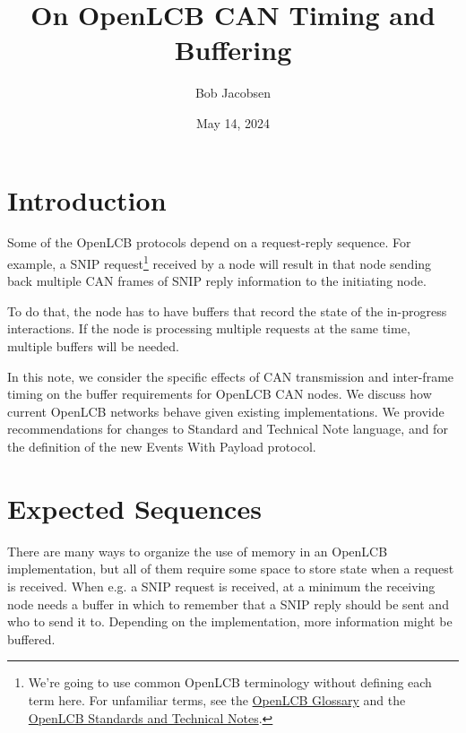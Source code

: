 \documentclass[11pt]{article}
\title{On OpenLCB CAN Timing and Buffering}
\author{Bob Jacobsen}
\date{May 14, 2024}                                         %
\begin{document}
\maketitle

\newcommand*{\xml}[1]{\texttt{<#1>}}

\newcommand{\ts}{\textsuperscript}

\newcommand{\us}{$\mu$s}

\section{Introduction}

Some of the OpenLCB protocols depend on a request-reply 
sequence.  For example, a SNIP 
request\footnote{We're going to use common OpenLCB terminology
    without defining each term here.  For unfamiliar terms, see the
    \href{https://nbviewer.org/github/openlcb/documents/blob/master/standards/GlossaryTN.pdf}{OpenLCB Glossary}
    and the 
    \href{https://openlcb.org/openlcb-and-lcc-documents/openlcb-specifications/}{OpenLCB Standards and Technical Notes}.
}
received by a node will result in that node sending back 
multiple CAN frames of SNIP reply information to the initiating node.

\cbstart
To do that, the node has to have buffers that record the state of the
in-progress interactions. If the node is processing multiple requests
at the same time, multiple buffers will be needed.

In this note, we consider the specific effects of CAN transmission
and inter-frame timing on the buffer requirements for OpenLCB CAN nodes.
We discuss how current OpenLCB networks behave given existing implementations.
We provide recommendations for changes to Standard and Technical Note
language, and for the definition of the new Events With Payload protocol.
\cbend

\section{Expected Sequences}

There are many ways to organize the use of memory
in an OpenLCB implementation, but all of them require some space to store state
when a request is received.
When e.g. a SNIP request is received, 
at a minimum the receiving node needs a buffer in which to 
remember that a SNIP reply should be sent and who to send it to.
Depending on the implementation, more information might be buffered.
\end{document}
